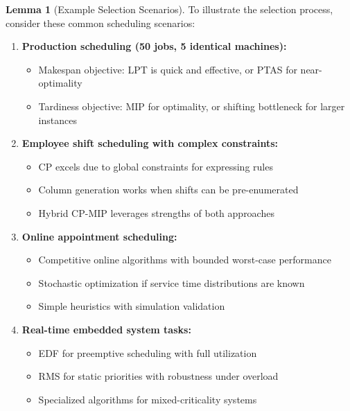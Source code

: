 \documentclass{article}
\theoremstyle{definition}
\newtheorem{lemma}{Lemma}
\begin{document}
\begin{lemma}[Example Selection Scenarios]
To illustrate the selection process, consider these common scheduling scenarios:

\begin{enumerate}
    \item \textbf{Production scheduling (50 jobs, 5 identical machines):}
    \begin{itemize}
        \item Makespan objective: LPT is quick and effective, or PTAS for near-optimality
        \item Tardiness objective: MIP for optimality, or shifting bottleneck for larger instances
    \end{itemize}
    
    \item \textbf{Employee shift scheduling with complex constraints:}
    \begin{itemize}
        \item CP excels due to global constraints for expressing rules
        \item Column generation works when shifts can be pre-enumerated
        \item Hybrid CP-MIP leverages strengths of both approaches
    \end{itemize}
    
    \item \textbf{Online appointment scheduling:}
    \begin{itemize}
        \item Competitive online algorithms with bounded worst-case performance
        \item Stochastic optimization if service time distributions are known
        \item Simple heuristics with simulation validation
    \end{itemize}
    
    \item \textbf{Real-time embedded system tasks:}
    \begin{itemize}
        \item EDF for preemptive scheduling with full utilization
        \item RMS for static priorities with robustness under overload
        \item Specialized algorithms for mixed-criticality systems
    \end{itemize}
\end{enumerate}
\end{lemma}
\end{document}
